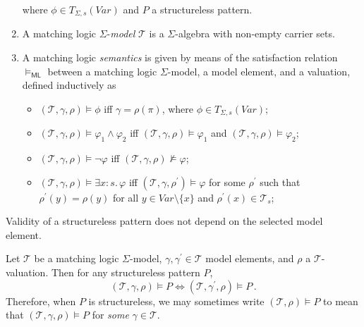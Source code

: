 \documentclass{article}
\newcommand{\ML}{\mathsf{ML}}
\begin{document}
\begin{definition}
\begin{enumerate}
          where $\phi \in T_{\Sigma, s}(\mathit{Var})$ and $P$ a structureless pattern.
    \item A matching logic $\Sigma$-\emph{model} $\mathcal{T}$ is a $\Sigma$-algebra with non-empty carrier sets.
    \item A matching logic \emph{semantics} is given by means of
          the satisfaction relation $\vDash_{\ML}$ between a matching logic $\Sigma$-model,
          a model element, and a valuation,
          defined inductively as
          \begin{itemize}
              \item $(\mathcal{T}, \gamma, \rho) \vDash \phi$ iff $\gamma = \rho(\pi)$, where $\phi \in T_{\Sigma, s}(\mathit{Var})$;
              \item $(\mathcal{T}, \gamma, \rho) \vDash \varphi_1 \land \varphi_2$ iff
                $(\mathcal{T}, \gamma, \rho) \vDash \varphi_1$ and
                $(\mathcal{T}, \gamma, \rho) \vDash \varphi_2$;
              \item $(\mathcal{T}, \gamma, \rho) \vDash \neg \varphi$ iff
                $(\mathcal{T}, \gamma, \rho) \not\vDash \varphi$;
              \item $(\mathcal{T}, \gamma, \rho) \vDash \exists x : s.\, \varphi$ iff
                $(\mathcal{T}, \gamma, \rho^\prime) \vDash \varphi$ for some $\rho^\prime$ such that
                $\rho^\prime(y) = \rho(y)$ for all $y \in \mathit{Var} \setminus \{ x \}$
                and $\rho^\prime(x) \in \mathcal{T}_s$;
          \end{itemize}
          
\end{enumerate}

\end{definition}

Validity of a structureless pattern does not depend on the selected model element.
\begin{lemma}\label{lem:structurelessSemantics}
Let $\mathcal{T}$ be a matching logic $\Sigma$-model, $\gamma,\gamma^\prime \in \mathcal{T}$ model elements,
and $\rho$ a $\mathcal{T}$-valuation. Then for any structureless pattern $P$,
\begin{equation*}
    (\mathcal{T}, \gamma, \rho) \vDash P \iff (\mathcal{T}, \gamma^\prime, \rho) \vDash P \, .
\end{equation*}
Therefore, when $P$ is structureless, we may sometimes write $(\mathcal{T}, \rho) \vDash P$ to mean that 
$(\mathcal{T}, \gamma, \rho) \vDash P$ for \emph{some} $\gamma \in \mathcal{T}$.
\end{lemma}
\end{document}
